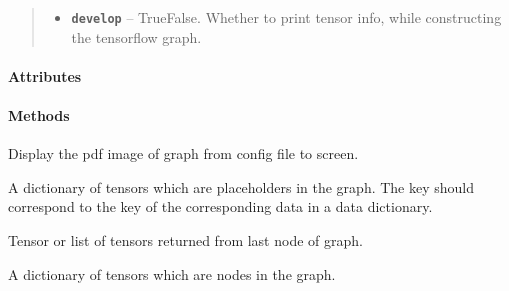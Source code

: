 \documentclass[letterpaper,10pt,english]{sphinxmanual}
\begin{document}
\begin{fulllineitems}
\begin{quote}
\begin{description}
\begin{itemize}
\item {} 
\textbf{\texttt{develop}} -- True\textbar{}False. Whether to print tensor info, while constructing the tensorflow graph.

\end{itemize}

\end{description}\end{quote}
\paragraph{Attributes}
\paragraph{Methods}

\begin{fulllineitems}
\label{config:config.AntGraph.display_graph}
Display the pdf image of graph from config file to screen.

\end{fulllineitems}


\begin{fulllineitems}
\label{config:config.AntGraph.get_array}
\end{fulllineitems}


\begin{fulllineitems}
\label{config:config.AntGraph.placeholderdict}
A dictionary of tensors which are placeholders in the graph. The key should correspond to the key of
the corresponding data in a data dictionary.

\end{fulllineitems}


\begin{fulllineitems}
\label{config:config.AntGraph.tensor_out}
Tensor or list of tensors returned from last node of graph.

\end{fulllineitems}


\begin{fulllineitems}
\label{config:config.AntGraph.tensordict}
A dictionary of tensors which are nodes in the graph.

\end{fulllineitems}


\end{fulllineitems}
\end{document}
